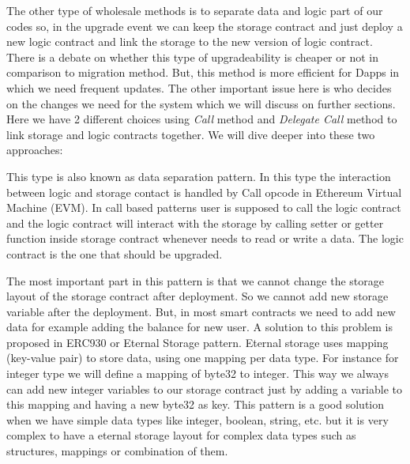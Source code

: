 The other type of wholesale methods is to separate data and logic part of our codes so, in the upgrade event we can keep the storage contract and just deploy a new logic contract and link the storage to the new version of logic contract.
There is a debate on whether this type of upgradeability is cheaper or not in comparison to migration method. But, this method is more efficient for Dapps in which we need frequent updates. The other important issue here is who decides on the changes we need for the system which we will discuss on further sections.
Here we have 2 different choices using \textit{Call} method and \textit{Delegate Call} method to link storage and logic contracts together. We will dive deeper into these two approaches:



This type is also known as data separation pattern. In this type the interaction between logic and storage contact is handled by Call opcode in Ethereum Virtual Machine (EVM). In call based patterns user is supposed to call the logic contract and the logic contract will interact with the storage by calling setter or getter function inside storage contract whenever needs to read or write a data. The logic contract is the one that should be upgraded.

The most important part in this pattern is that we cannot change the storage layout of the storage contract after deployment. So we cannot add new storage variable after the deployment. But, in most smart contracts we need to add new data for example adding the balance for new user. A solution to this problem is proposed in ERC930 or Eternal Storage pattern. Eternal storage uses mapping (key-value pair) to store data, using one mapping per data type. For instance for integer type we will define a mapping of byte32 to integer. This way we always can add new integer variables to our storage contract just by adding a variable to this mapping and having a new byte32 as key. This pattern is a good solution when we have simple data types like integer, boolean, string, etc. but it is very complex to have a eternal storage layout for complex data types such as structures, mappings or combination of them.

